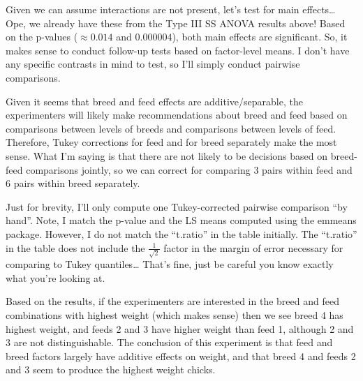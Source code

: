 \documentclass[
]{book}
\begin{document}
Given we can assume interactions are not present, let's test for main effects\ldots{} Ope, we already have these from the Type III SS ANOVA results above! Based on the p-values (\(\approx 0.014\) and \(0.000004\)), both main effects are significant. So, it makes sense to conduct follow-up tests based on factor-level means. I don't have any specific contrasts in mind to test, so I'll simply conduct pairwise comparisons.

Given it seems that breed and feed effects are additive/separable, the experimenters will likely make recommendations about breed and feed based on comparisons between levels of breeds and comparisons between levels of feed. Therefore, Tukey corrections for feed and for breed separately make the most sense. What I'm saying is that there are not likely to be decisions based on breed-feed comparisons jointly, so we can correct for comparing 3 pairs within feed and 6 pairs within breed separately.

Just for brevity, I'll only compute one Tukey-corrected pairwise comparison ``by hand''. Note, I match the p-value and the LS means computed using the emmeans package. However, I do not match the ``t.ratio'' in the table initially. The ``t.ratio'' in the table does not include the \(\frac{1}{\sqrt{2}}\) factor in the margin of error necessary for comparing to Tukey quantiles\ldots{} That's fine, just be careful you know exactly what you're looking at.

Based on the results, if the experimenters are interested in the breed and feed combinations with highest weight (which makes sense) then we see breed 4 has highest weight, and feeds 2 and 3 have higher weight than feed 1, although 2 and 3 are not distinguishable. The conclusion of this experiment is that feed and breed factors largely have additive effects on weight, and that breed 4 and feeds 2 and 3 seem to produce the highest weight chicks.
\end{document}
